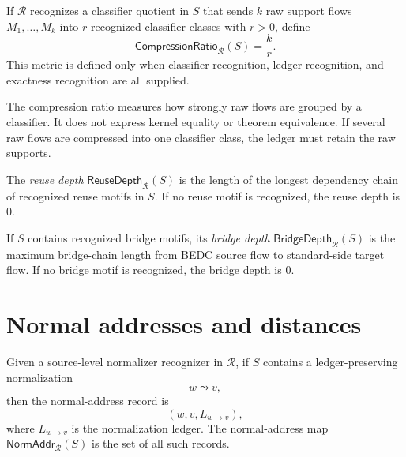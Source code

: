 \begin{definition}
\label{def:metrics-compression-ratio}
If $\mathcal R$ recognizes a classifier quotient in $S$ that sends $k$ raw support flows $M_1,\ldots,M_k$ into $r$ recognized classifier classes with $r>0$, define
$$
  \mathsf{CompressionRatio}_{\mathcal R}(S)=\frac{k}{r}.
$$
This metric is defined only when classifier recognition, ledger recognition, and exactness recognition are all supplied.
\end{definition}

\begin{remark}
\label{rem:metrics-compression-not-equality}
The compression ratio measures how strongly raw flows are grouped by a classifier. It does not express kernel equality or theorem equivalence. If several raw flows are compressed into one classifier class, the ledger must retain the raw supports.
\end{remark}

\begin{definition}
\label{def:metrics-reuse-depth}
The \emph{reuse depth} $\mathsf{ReuseDepth}_{\mathcal R}(S)$ is the length of the longest dependency chain of recognized reuse motifs in $S$. If no reuse motif is recognized, the reuse depth is $0$.
\end{definition}

\begin{definition}
\label{def:metrics-bridge-depth}
If $S$ contains recognized bridge motifs, its \emph{bridge depth} $\mathsf{BridgeDepth}_{\mathcal R}(S)$ is the maximum bridge-chain length from BEDC source flow to standard-side target flow. If no bridge motif is recognized, the bridge depth is $0$.
\end{definition}

\section{Normal addresses and distances}
\label{sec:metrics-normal-addresses}

\begin{definition}
\label{def:metrics-normal-address-map}
Given a source-level normalizer recognizer in $\mathcal R$, if $S$ contains a ledger-preserving normalization
$$
  w\leadsto v,
$$
then the normal-address record is
$$
  (w,v,L_{w\to v}),
$$
where $L_{w\to v}$ is the normalization ledger. The normal-address map $\mathsf{NormAddr}_{\mathcal R}(S)$ is the set of all such records.
\end{definition}

